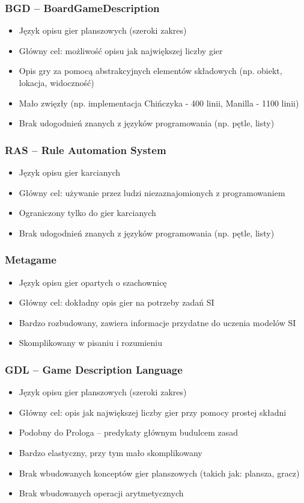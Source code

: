 \documentclass{beamer}
\begin{document}
\begin{frame}
	\frametitle{BGD -- BoardGameDescription\cite{BGD}}
	\begin{itemize}
		\item Język opisu gier planszowych (szeroki zakres)
		\item Główny cel: możliwość opisu jak największej liczby gier
		\item Opis gry za pomocą abstrakcyjnych elementów składowych (np. obiekt, lokacja, widoczność)
		\item Mało zwięzły (np. implementacja Chińczyka - 400 linii, Manilla - 1100 linii)
		\item Brak udogodnień znanych z języków programowania (np. pętle, listy)
	\end{itemize}
\end{frame}

\begin{frame}
	\frametitle{RAS -- Rule Automation System\cite{RAS}}
	\begin{itemize}
		\item Język opisu gier karcianych
		\item Główny cel: używanie przez ludzi niezaznajomionych z programowaniem
		\item Ograniczony tylko do gier karcianych
		\item Brak udogodnień znanych z języków programowania (np. pętle, listy)
	\end{itemize}
\end{frame}

\begin{frame}
	\frametitle{Metagame\cite{metagame}}
	\begin{itemize}
		\item Język opisu gier opartych o szachownicę
		\item Główny cel: dokładny opis gier na potrzeby zadań SI
		\item Bardzo rozbudowany, zawiera informacje przydatne do uczenia modelów SI
		\item Skomplikowany w pisaniu i rozumieniu
	\end{itemize}
\end{frame}

\begin{frame}
	\frametitle{GDL -- Game Description Language\cite{GDL}}
	\begin{itemize}
		\item Język opisu gier planszowych (szeroki zakres)
		\item Główny cel: opis jak największej liczby gier przy pomocy prostej składni
		\item Podobny do Prologa -- predykaty głównym budulcem zasad
		\item Bardzo elastyczny, przy tym mało skomplikowany
		\item Brak wbudowanych konceptów gier planszowych (takich jak: plansza, gracz)
		\item Brak wbudowanych operacji arytmetycznych
	\end{itemize}
\end{frame}
\end{document}
